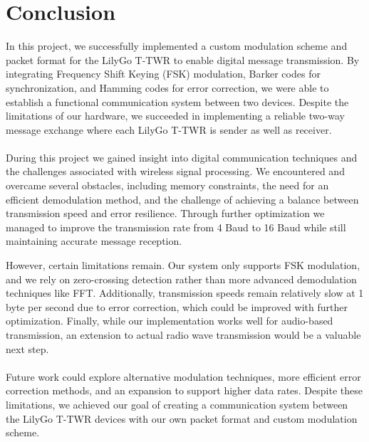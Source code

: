 \chapter{Conclusion}

In this project, we successfully implemented a custom modulation scheme and packet format for the LilyGo T-TWR to enable digital message transmission. By integrating Frequency Shift Keying (FSK) modulation, Barker codes for synchronization, and Hamming codes for error correction, we were able to establish a functional communication system between two devices. Despite the limitations of our hardware, we succeeded in implementing a reliable two-way message exchange where each LilyGo T-TWR is sender as well as receiver.
\\ \\
During this project we gained insight into digital communication techniques and the challenges associated with wireless signal processing. We encountered and overcame several obstacles, including memory constraints, the need for an efficient demodulation method, and the challenge of achieving a balance between transmission speed and error resilience. Through further optimization we managed to improve the transmission rate from 4 Baud to 16 Baud while still maintaining accurate message reception.

However, certain limitations remain. Our system only supports FSK modulation, and we rely on zero-crossing detection rather than more advanced demodulation techniques like FFT. Additionally, transmission speeds remain relatively slow at 1 byte per second due to error correction, which could be improved with further optimization. Finally, while our implementation works well for audio-based transmission, an extension to actual radio wave transmission would be a valuable next step.
\\ \\
Future work could explore alternative modulation techniques, more efficient error correction methods, and an expansion to support higher data rates. Despite these limitations, we achieved our goal of creating a communication system between the LilyGo T-TWR devices with our own packet format and custom modulation scheme.